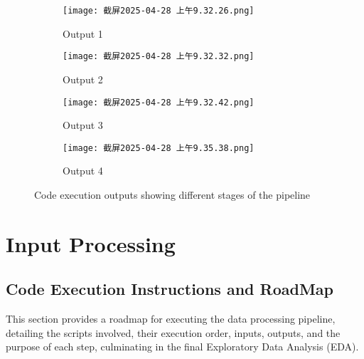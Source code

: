 \documentclass[12pt]{article}
\begin{document}
\begin{figure}[!p]
  \centering
  
  \begin{subfigure}{0.5\textwidth}
    \texttt{[image: 截屏2025-04-28 上午9.32.26.png]}
    \caption{Output 1}
    \label{fig:out1}
  \end{subfigure}
  
  \vspace{2pt} %
  
  \begin{subfigure}{0.5\textwidth}
    \texttt{[image: 截屏2025-04-28 上午9.32.32.png]}
    \caption{Output 2}
    \label{fig:out2}
  \end{subfigure}
  
  \vspace{2pt}
  
  \begin{subfigure}{0.5\textwidth}
    \texttt{[image: 截屏2025-04-28 上午9.32.42.png]}
    \caption{Output 3}
    \label{fig:out3}
  \end{subfigure}
  
  \vspace{2pt}
  
  \begin{subfigure}{0.5\textwidth}
    \texttt{[image: 截屏2025-04-28 上午9.35.38.png]}
    \caption{Output 4}
    \label{fig:out4}
  \end{subfigure}
  
  \caption{Code execution outputs showing different stages of the pipeline}
  \label{fig:all_outputs}
\end{figure}

\newpage
\section{Input Processing}
\subsection{Code Execution Instructions and RoadMap}\label{code-execution-instructions-and-roadmap}

This section provides a roadmap for executing the data processing
pipeline, detailing the scripts involved, their execution order, inputs,
outputs, and the purpose of each step, culminating in the final
Exploratory Data Analysis (EDA).
\end{document}
